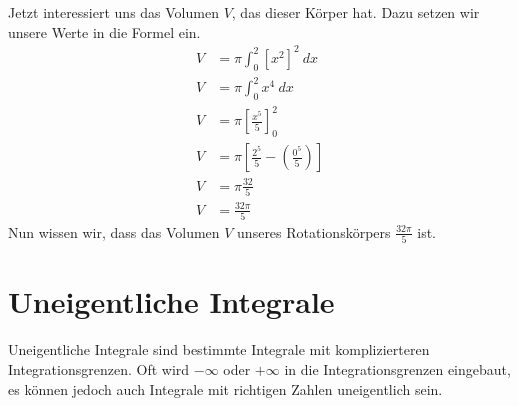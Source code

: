 \begin{flushleft}
    Jetzt interessiert uns das Volumen $V$, das dieser Körper hat.
    Dazu setzen wir unsere Werte in die Formel ein.
    \begin{align}
        V &=\pi\int_{0}^{2}\left[x^2\right]^2 \ dx \\
        V &=\pi\int_{0}^{2} x^4 \ dx \\
        V &=\pi \left[\frac{x^5}{5}\right]_{0}^{2} \\
        V &=\pi \left[\frac{2^5}{5}-\left(\frac{0^5}{5}\right)\right] \\
        V &=\pi \frac{32}{5} \\
        V &=\frac{32\pi}{5}
    \end{align}
    Nun wissen wir, dass das Volumen $V$ unseres Rotationskörpers $\frac{32\pi}{5}$ ist.
\end{flushleft}

\section{Uneigentliche Integrale}

\begin{flushleft}
    Uneigentliche Integrale sind bestimmte Integrale mit komplizierteren Integrationsgrenzen.
    Oft wird $-\infty$ oder $+\infty$ in die Integrationsgrenzen eingebaut, es können jedoch auch Integrale mit richtigen Zahlen uneigentlich sein.
\end{flushleft}

\begin{center}
\end{center}

